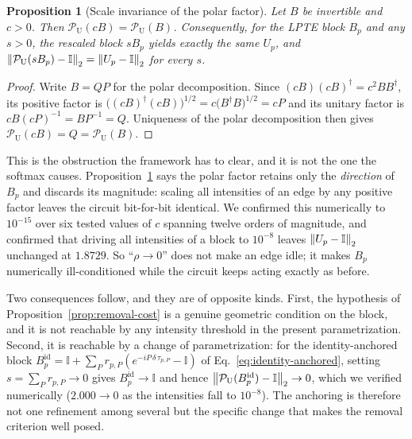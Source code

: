 \documentclass[twocolumn,aps,prl,superscriptaddress,showkeys]{revtex4-2}
\theoremstyle{plain}
\newtheorem{proposition}{Proposition}
\theoremstyle{definition}
\begin{document}
\begin{proposition}[Scale invariance of the polar factor]
\label{prop:scalefree}
Let $B$ be invertible and $c>0$. Then $\mathcal P_{\mathrm U}(cB)=\mathcal P_{\mathrm U}(B)$. Consequently, for the LPTE block $B_p$ and any $s>0$, the rescaled block $sB_p$ yields exactly the same $U_p$, and $\norm{\mathcal P_{\mathrm U}(sB_p)-\mathbb{I}}_2=\norm{U_p-\mathbb{I}}_2$ for every $s$.
\end{proposition}
\begin{proof}
Write $B=QP$ for the polar decomposition. Since $(cB)(cB)^\dagger=c^2BB^\dagger$, its positive factor is $\bigl((cB)^\dagger(cB)\bigr)^{1/2}=c\bigl(B^\dagger B\bigr)^{1/2}=cP$ and its unitary factor is $cB(cP)^{-1}=BP^{-1}=Q$. Uniqueness of the polar decomposition then gives $\mathcal P_{\mathrm U}(cB)=Q=\mathcal P_{\mathrm U}(B)$.
\end{proof}

This is the obstruction the framework has to clear, and it is not the one the softmax causes. Proposition~\ref{prop:scalefree} says the polar factor retains only the \emph{direction} of $B_p$ and discards its magnitude: scaling all intensities of an edge by any positive factor leaves the circuit bit-for-bit identical. We confirmed this numerically to $10^{-15}$ over six tested values of $c$ spanning twelve orders of magnitude, and confirmed that driving all intensities of a block to $10^{-8}$ leaves $\norm{U_p-\mathbb{I}}_2$ unchanged at $1.8729$. So ``$\rho\to0$'' does not make an edge idle; it makes $B_p$ numerically ill-conditioned while the circuit keeps acting exactly as before.

Two consequences follow, and they are of opposite kinds. First, the hypothesis of Proposition~\ref{prop:removal-cost} is a genuine geometric condition on the block, and it is not reachable by any intensity threshold in the present parametrization. Second, it is reachable by a change of parametrization: for the identity-anchored block $B_p^{\mathrm{id}}=\mathbb{I}+\sum_P r_{p,P}(e^{-iP\,\delta\,\tau_{p,P}}-\mathbb{I})$ of Eq.~\eqref{eq:identity-anchored}, setting $s=\sum_P r_{p,P}\to0$ gives $B_p^{\mathrm{id}}\to\mathbb{I}$ and hence $\norm{\mathcal P_{\mathrm U}(B_p^{\mathrm{id}})-\mathbb{I}}_2\to0$, which we verified numerically ($2.000\to 0$ as the intensities fall to $10^{-8}$). The anchoring is therefore not one refinement among several but the specific change that makes the removal criterion well posed.
\end{document}
